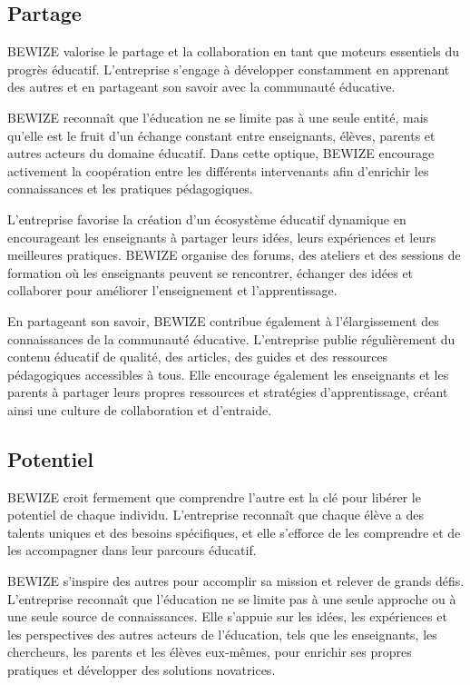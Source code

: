 \subsection{Partage} 
BEWIZE valorise le partage et la collaboration en tant que moteurs essentiels du progrès éducatif. L'entreprise s'engage à développer constamment en apprenant des autres et en partageant son savoir avec la communauté éducative.

BEWIZE reconnaît que l'éducation ne se limite pas à une seule entité, mais qu'elle est le fruit d'un échange constant entre enseignants, élèves, parents et autres acteurs du domaine éducatif. Dans cette optique, BEWIZE encourage activement la coopération entre les différents intervenants afin d'enrichir les connaissances et les pratiques pédagogiques.

L'entreprise favorise la création d'un écosystème éducatif dynamique en encourageant les enseignants à partager leurs idées, leurs expériences et leurs meilleures pratiques. BEWIZE organise des forums, des ateliers et des sessions de formation où les enseignants peuvent se rencontrer, échanger des idées et collaborer pour améliorer l'enseignement et l'apprentissage.

En partageant son savoir, BEWIZE contribue également à l'élargissement des connaissances de la communauté éducative. L'entreprise publie régulièrement du contenu éducatif de qualité, des articles, des guides et des ressources pédagogiques accessibles à tous. Elle encourage également les enseignants et les parents à partager leurs propres ressources et stratégies d'apprentissage, créant ainsi une culture de collaboration et d'entraide.

\subsection{Potentiel} 
BEWIZE croit fermement que comprendre l'autre est la clé pour libérer le potentiel de chaque individu. L'entreprise reconnaît que chaque élève a des talents uniques et des besoins spécifiques, et elle s'efforce de les comprendre et de les accompagner dans leur parcours éducatif.

BEWIZE s'inspire des autres pour accomplir sa mission et relever de grands défis. L'entreprise reconnaît que l'éducation ne se limite pas à une seule approche ou à une seule source de connaissances. Elle s'appuie sur les idées, les expériences et les perspectives des autres acteurs de l'éducation, tels que les enseignants, les chercheurs, les parents et les élèves eux-mêmes, pour enrichir ses propres pratiques et développer des solutions novatrices.

